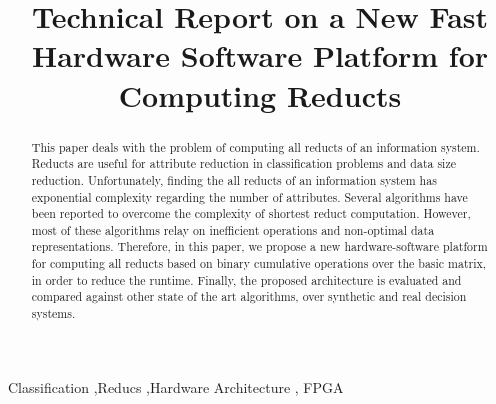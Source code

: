 \documentclass[authoryear,preprint,review,12pt]{elsarticle}
\begin{document}
\begin{frontmatter}



\title{Technical Report on a New Fast Hardware Software Platform for Computing Reducts}



\address{Computer Science Department}
\address{National Institute for Astrophysics, Optics and Electronics}
\address{Sta. Ma. Tonanzintla, Puebla, 72840, Mexico}

\begin{abstract}
	This paper deals with the problem of computing all reducts of an information system. Reducts are useful for attribute reduction in classification problems and data size reduction. Unfortunately, finding the all reducts of an information system has exponential complexity regarding the number of attributes. Several algorithms have been reported to overcome the complexity of shortest reduct computation. However, most of these algorithms relay on inefficient operations and non-optimal data representations. Therefore, in this paper, we propose a new hardware-software platform for computing all reducts based on binary cumulative operations over the basic matrix, in order to reduce the runtime. Finally, the proposed architecture is evaluated and compared against other state of the art algorithms, over synthetic and real decision systems.
\end{abstract}

\begin{keyword}
Classification \sep Reducs \sep Hardware Architecture \sep
FPGA

\end{keyword}

\end{frontmatter}
\end{document}
